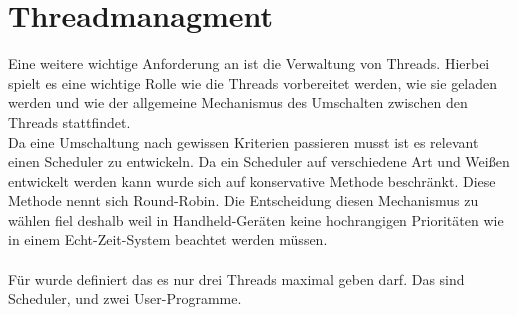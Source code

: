 \section{Threadmanagment}
Eine weitere wichtige Anforderung an \mops ist die Verwaltung von Threads. Hierbei spielt es eine wichtige Rolle wie die Threads vorbereitet werden, wie sie geladen werden und wie der allgemeine Mechanismus des Umschalten zwischen den Threads stattfindet.\\
Da eine Umschaltung nach gewissen Kriterien passieren musst ist es relevant einen Scheduler zu entwickeln. Da ein Scheduler auf verschiedene Art und Wei\ss en entwickelt werden kann wurde sich auf konservative Methode beschr\"ankt. Diese Methode nennt sich Round-Robin. Die Entscheidung diesen Mechanismus zu w\"ahlen fiel deshalb weil in Handheld-Ger\"aten keine hochrangigen Priorit\"aten wie in einem Echt-Zeit-System beachtet werden m\"ussen.\\ \\
F\"ur \mops wurde definiert das es nur drei Threads maximal geben darf. Das sind Scheduler, und zwei User-Programme.

